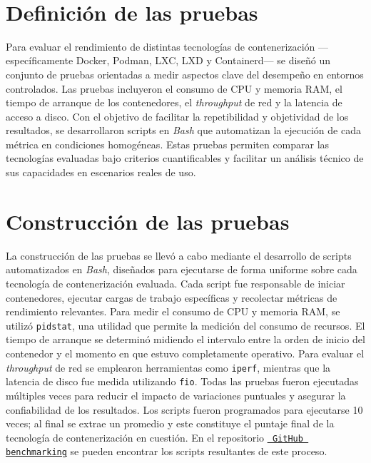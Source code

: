 \label{cap:benchmarking}

\mbox{}\\
\section{Definición de las pruebas}
\noindent
Para evaluar el rendimiento de distintas tecnologías de contenerización —específicamente Docker, Podman, LXC, LXD y Containerd— se diseñó un conjunto de pruebas orientadas a medir aspectos clave del desempeño en entornos controlados. Las pruebas incluyeron el consumo de CPU y memoria RAM, el tiempo de arranque de los contenedores, el \textit{throughput} de red y la latencia de acceso a disco. 
Con el objetivo de facilitar la repetibilidad y objetividad de los resultados, se desarrollaron scripts en \textit{Bash} que automatizan la ejecución de cada métrica en condiciones homogéneas. Estas pruebas permiten comparar las tecnologías evaluadas bajo criterios cuantificables y facilitar un análisis técnico de sus capacidades en escenarios reales de uso.

\section{Construcción de las pruebas}
\noindent
La construcción de las pruebas se llevó a cabo mediante el desarrollo de scripts automatizados en \textit{Bash}, diseñados para ejecutarse de forma uniforme sobre cada tecnología de contenerización evaluada. Cada script fue responsable de iniciar contenedores, ejecutar cargas de trabajo específicas y recolectar métricas de rendimiento relevantes.
Para medir el consumo de CPU y memoria RAM, se utilizó \texttt{pidstat}, una utilidad que permite la medición del consumo de recursos. El tiempo de arranque se determinó midiendo el intervalo entre la orden de inicio del contenedor y el momento en que estuvo completamente operativo. 
Para evaluar el \textit{throughput} de red se emplearon herramientas como \texttt{iperf}, mientras que la latencia de disco fue medida utilizando \texttt{fio}. Todas las pruebas fueron ejecutadas múltiples veces para reducir el impacto de variaciones puntuales y asegurar la confiabilidad de los resultados. Los scripts fueron programados para ejecutarse 10 veces; al final se extrae un promedio y este constituye el puntaje final de la tecnología de contenerización en cuestión.
En el repositorio \underline{\href{https://github.com/Anubis-1001/benchmark-tecnologias-de-contenerizacion} {\texttt{ GitHub benchmarking}}} se pueden encontrar los scripts resultantes de este proceso.

